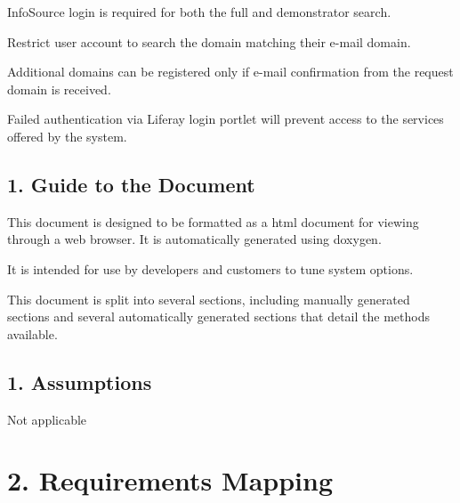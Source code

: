 \begin{DoxyEnumerate}
\item Info\+Source login is required for both the full and demonstrator search.
\item Restrict user account to search the domain matching their e-\/mail domain.
\item Additional domains can be registered only if e-\/mail confirmation from the request domain is received.
\item Failed authentication via Liferay login portlet will prevent access to the services offered by the system.
\end{DoxyEnumerate}\hypertarget{index_sec_1_2}{}\subsection{1. Guide to the Document}\label{index_sec_1_2}
\begin{DoxyVerb}This document is designed to be formatted as a html document for viewing through
a web browser. It is automatically generated using doxygen.


It is intended for use by developers and customers to tune system options.


This document is split into several sections, including manually generated sections
and several automatically generated sections that detail the methods available.
\end{DoxyVerb}
\hypertarget{index_sec_1_3}{}\subsection{1.	\+Assumptions}\label{index_sec_1_3}
\begin{DoxyVerb}Not applicable
\end{DoxyVerb}
\hypertarget{index_sec_2}{}\section{2.	\+Requirements Mapping}\label{index_sec_2}
